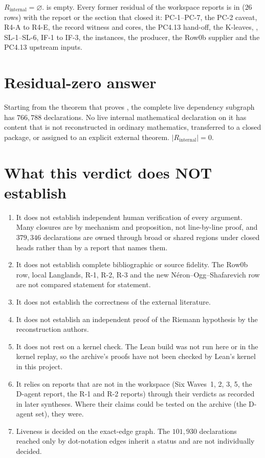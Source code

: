 \documentclass[10pt]{article}
\newcommand{\PC}[1]{\textsf{PC-#1}}
\newcommand{\SL}[1]{\textsf{SL-#1}}
\begin{document}
$R_{\mathrm{internal}}=\varnothing$.  is empty. Every former residual of the workspace reports is in  ($26$ rows) with the report or the section that closed it: \PC{1}--\PC{7}, the \PC{2} caveat, R4-A to R4-E, the record witness and cores, the PC4.13 hand-off, the K-leaves, , \SL{1}--\SL{6}, IF-1 to IF-3, the  instances, the  producer, the Row0b supplier and the PC4.13 upstream inputs.

\section{Residual-zero answer}

Starting from the theorem that proves , the complete live dependency subgraph has $766{,}788$ declarations. No live internal mathematical declaration on it has content that is not reconstructed in ordinary mathematics, transferred to a closed package, or assigned to an explicit external theorem. $\lvert R_{\mathrm{internal}}\rvert=0$.

\section{What this verdict does NOT establish}\label{sec:not}

\begin{enumerate}[nosep]
\item It does not establish independent human verification of every argument. Many closures are by mechanism and proposition, not line-by-line proof, and $379{,}346$ declarations are owned through broad or shared regions under closed heads rather than by a report that names them.
\item It does not establish complete bibliographic or source fidelity. The Row0b row, local Langlands, R-1, R-2, R-3 and the new N\'eron--Ogg--Shafarevich row are not compared statement for statement.
\item It does not establish the correctness of the external literature.
\item It does not establish an independent proof of the Riemann hypothesis by the reconstruction authors.
\item It does not rest on a kernel check. The Lean build was not run here or in the kernel replay, so the archive's proofs have not been checked by Lean's kernel in this project.
\item It relies on reports that are not in the workspace (Six Waves~1, 2, 3, 5, the D-agent report, the R-1 and R-2 reports) through their verdicts as recorded in later syntheses. Where their claims could be tested on the archive (the D-agent set), they were.
\item Liveness is decided on the exact-edge graph. The $101{,}930$ declarations reached only by dot-notation edges inherit a status and are not individually decided.
\end{enumerate}
\end{document}
